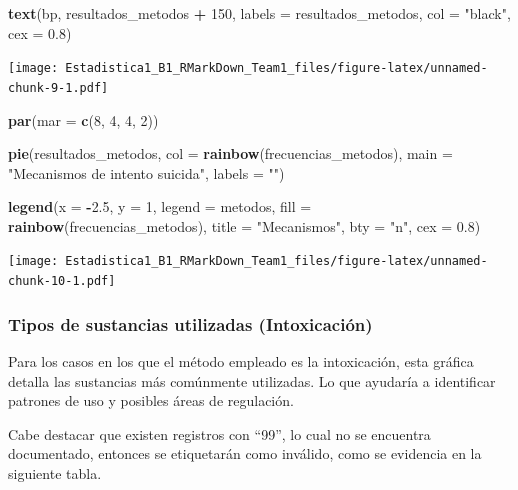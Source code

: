 \documentclass[
]{article}
\newenvironment{Shaded}{\begin{snugshade}}{\end{snugshade}}
\newcommand{\AttributeTok}[1]{\textcolor[rgb]{0.13,0.29,0.53}{#1}}
\newcommand{\DecValTok}[1]{\textcolor[rgb]{0.00,0.00,0.81}{#1}}
\newcommand{\FloatTok}[1]{\textcolor[rgb]{0.00,0.00,0.81}{#1}}
\newcommand{\FunctionTok}[1]{\textcolor[rgb]{0.13,0.29,0.53}{\textbf{#1}}}
\newcommand{\NormalTok}[1]{#1}
\newcommand{\SpecialCharTok}[1]{\textcolor[rgb]{0.81,0.36,0.00}{\textbf{#1}}}
\newcommand{\StringTok}[1]{\textcolor[rgb]{0.31,0.60,0.02}{#1}}
\begin{document}
\begin{Shaded}
\begin{Highlighting}[]
\FunctionTok{text}\NormalTok{(bp, resultados\_metodos }\SpecialCharTok{+} \DecValTok{150}\NormalTok{, }\AttributeTok{labels =}\NormalTok{ resultados\_metodos, }\AttributeTok{col =} \StringTok{"black"}\NormalTok{, }\AttributeTok{cex =} \FloatTok{0.8}\NormalTok{)}
\end{Highlighting}
\end{Shaded}

\texttt{[image: Estadistica1\_B1\_RMarkDown\_Team1\_files/figure-latex/unnamed-chunk-9-1.pdf]}

\begin{Shaded}
\begin{Highlighting}[]
\FunctionTok{par}\NormalTok{(}\AttributeTok{mar =} \FunctionTok{c}\NormalTok{(}\DecValTok{8}\NormalTok{, }\DecValTok{4}\NormalTok{, }\DecValTok{4}\NormalTok{, }\DecValTok{2}\NormalTok{))}

\FunctionTok{pie}\NormalTok{(resultados\_metodos, }\AttributeTok{col =} \FunctionTok{rainbow}\NormalTok{(frecuencias\_metodos), }\AttributeTok{main =} \StringTok{"Mecanismos de intento suicida"}\NormalTok{, }\AttributeTok{labels =} \StringTok{""}\NormalTok{)}

\FunctionTok{legend}\NormalTok{(}\AttributeTok{x =} \SpecialCharTok{{-}}\FloatTok{2.5}\NormalTok{, }\AttributeTok{y =} \DecValTok{1}\NormalTok{, }\AttributeTok{legend =}\NormalTok{ metodos, }\AttributeTok{fill =} \FunctionTok{rainbow}\NormalTok{(frecuencias\_metodos), }\AttributeTok{title =} \StringTok{"Mecanismos"}\NormalTok{, }\AttributeTok{bty =} \StringTok{"n"}\NormalTok{, }\AttributeTok{cex =} \FloatTok{0.8}\NormalTok{)}
\end{Highlighting}
\end{Shaded}

\texttt{[image: Estadistica1\_B1\_RMarkDown\_Team1\_files/figure-latex/unnamed-chunk-10-1.pdf]}

\subsubsection{Tipos de sustancias utilizadas
(Intoxicación)}\label{tipos-de-sustancias-utilizadas-intoxicaciuxf3n}

Para los casos en los que el método empleado es la intoxicación, esta
gráfica detalla las sustancias más comúnmente utilizadas. Lo que
ayudaría a identificar patrones de uso y posibles áreas de regulación.

Cabe destacar que existen registros con ``99'', lo cual no se encuentra
documentado, entonces se etiquetarán como inválido, como se evidencia en
la siguiente tabla.
\end{document}

